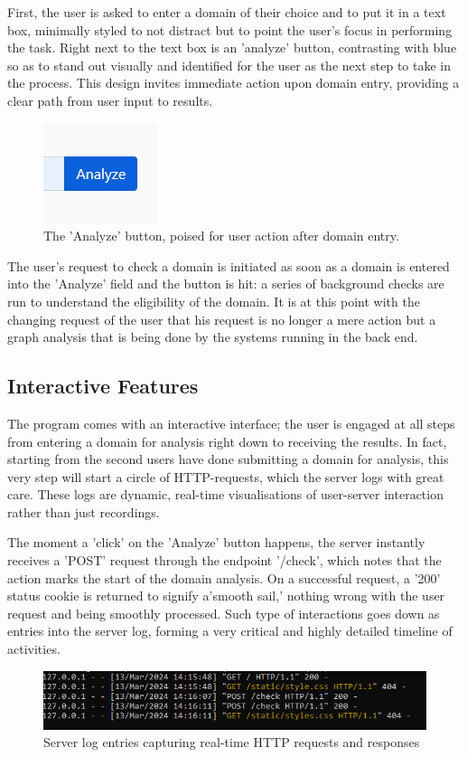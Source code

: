 First, the user is asked to enter a domain of their choice and to put it in a text box, minimally styled to not distract but to point the user's focus in performing the task. Right next to the text box is an 'analyze' button, contrasting with blue so as to stand out visually and identified for the user as the next step to take in the process. This design invites immediate action upon domain entry, providing a clear path from user input to results.

\begin{figure}[H]
    \centering
    \includegraphics[width=0.3\linewidth]{project/8.png}
    \caption{The 'Analyze' button, poised for user action after domain entry.}
    \label{fig:imple2222}
\end{figure}

The user's request to check a domain is initiated as soon as a domain is entered into the 'Analyze' field and the button is hit: a series of background checks are run to understand the eligibility of the domain. It is at this point with the changing request of the user that his request is no longer a mere action but a graph analysis that is being done by the systems running in the back end.

\subsection{Interactive Features}

The program comes with an interactive interface; the user is engaged at all steps from entering a domain for analysis right down to receiving the results. In fact, starting from the second users have done submitting a domain for analysis, this very step will start a circle of HTTP-requests, which the server logs with great care. These logs are dynamic, real-time visualisations of user-server interaction rather than just recordings.


The moment a 'click' on the 'Analyze' button happens, the server instantly receives a 'POST' request through the endpoint '/check', which notes that the action marks the start of the domain analysis. On a successful request, a '200' status cookie is returned to signify a'smooth sail,' nothing wrong with the user request and being smoothly processed. Such type of interactions goes down as entries into the server log, forming a very critical and highly detailed timeline of activities.
\begin{figure}[H]
    \centering
    \includegraphics[width=0.8\linewidth]{project/I.png}
    \caption{Server log entries capturing real-time HTTP requests and responses}
    \label{fig:imple22222}
\end{figure}

